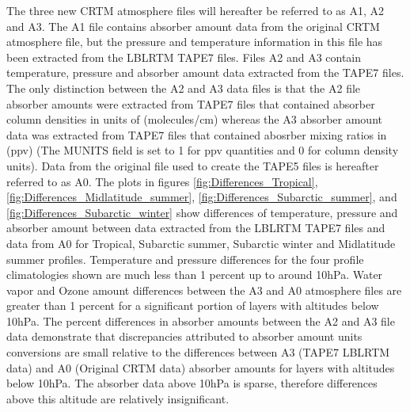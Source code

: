 The three new CRTM atmosphere files will hereafter be referred to as A1, A2 and A3. The A1 file contains absorber amount data from the original CRTM atmosphere file, but the pressure and temperature information in this file has been extracted from the LBLRTM TAPE7 files. Files A2 and A3 contain temperature, pressure and absorber amount data extracted from the TAPE7 files. The only distinction between the A2 and A3 data files is that the A2 file absorber amounts were extracted from TAPE7 files that contained absorber column densities in units of (molecules/cm) whereas the A3 absorber amount data was extracted from TAPE7 files that contained abosrber mixing ratios in (ppv) (The MUNITS field is set to 1 for ppv quantities and 0 for column density units). Data from the original file used to create the TAPE5 files is hereafter referred to as A0. The plots in figures \ref{fig:Differences_Tropical}, \ref{fig:Differences_Midlatitude_summer}, \ref{fig:Differences_Subarctic_summer}, and \ref{fig:Differences_Subarctic_winter} show differences of temperature, pressure and absorber amount between data extracted from the LBLRTM TAPE7 files and data from A0 for Tropical, Subarctic summer, Subarctic winter and Midlatitude summer profiles. Temperature and pressure differences for the four profile climatologies shown are much less than 1 percent up to around 10hPa. Water vapor and Ozone amount differences between the A3 and A0 atmosphere files are greater than 1 percent for a significant portion of layers with altitudes below 10hPa. The percent differences in absorber amounts between the A2 and A3 file data demonstrate that discrepancies attributed to absorber amount units conversions are small relative to the differences between A3 (TAPE7 LBLRTM data) and A0 (Original CRTM data) absorber amounts for layers with altitudes below 10hPa. The absorber data above 10hPa is sparse, therefore differences above this altitude are relatively insignificant. 



